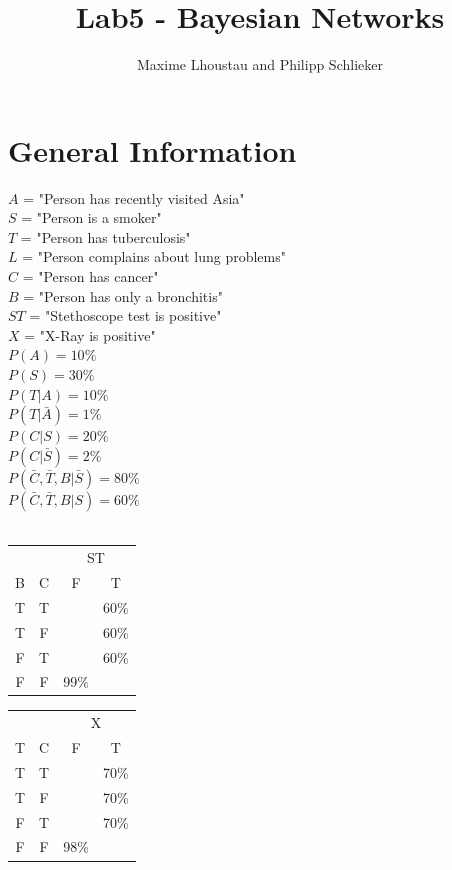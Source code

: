 \documentclass[12pt]{article}
\begin{document}
\title{Lab5 - Bayesian Networks}
\author{Maxime Lhoustau and Philipp Schlieker}
\maketitle

\section*{General Information}
$A$ = "Person has recently visited Asia"\\
$S$ = "Person is a smoker"\\
$T$ = "Person has tuberculosis"\\
$L$ = "Person complains about lung problems"\\
$C$ = "Person has cancer"\\
$B$ = "Person has only a bronchitis"\\
$ST$ = "Stethoscope test is positive"\\
$X$ = "X-Ray is positive"\\
$P(A) = 10 \%$\\
$P(S) = 30 \%$\\
$P(T|A) = 10 \%$\\
$P(T|\bar{A}) = 1 \%$\\
$P(C|S) = 20\%$\\
$P(C|\bar{S}) = 2\%$\\
$P(\bar{C},\bar{T},B|\bar{S}) = 80\%$\\
$P(\bar{C},\bar{T},B|S) = 60\%$\\
\\
\begin{tabular}{|c|c|cc|}
\hline
 & & \multicolumn{2}{|c|}{ST} \\
B&C&F&T\\
\hline
T&T&&60\%\\
T&F&&60\%\\
F&T&&60\%\\
F&F&99\%&\\
\hline
\end{tabular}

\begin{tabular}{|c|c|cc|}
\hline
 & & \multicolumn{2}{|c|}{X} \\
T&C&F&T\\
\hline
T&T&&70\%\\
T&F&&70\%\\
F&T&&70\%\\
F&F&98\%&\\
\hline
\end{tabular}
\newpage
\end{document}
